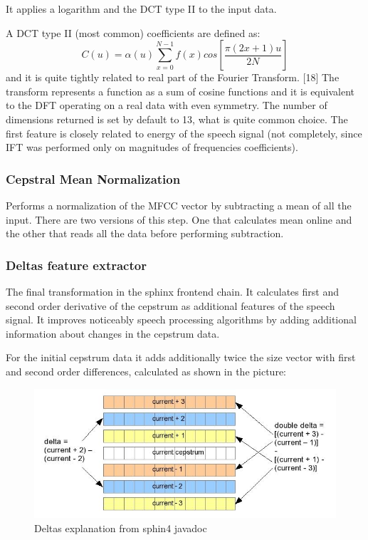 \documentclass[12pt,a4paper,english]{article}
\begin{document}
It applies a logarithm and the DCT type II to the input data.  \newline

A DCT type II (most common) coefficients are defined as: 
\begin{equation}
    C(u) = \alpha(u)\sum_{x=0}^{N-1} f(x)cos[\frac{\pi(2x+1)u}{2N}] 
\end{equation}
and it is quite tightly related to real part of the Fourier Transform. [18]
The transform represents a function as a sum of cosine functions and it is equivalent to the DFT operating on a real data with even symmetry. \newline
The number of dimensions returned is set by default to 13, what is quite common choice. The first feature is closely related
to energy of the speech signal (not completely, since IFT was performed only on magnitudes of frequencies coefficients).

\subsubsection{Cepstral Mean Normalization}

Performs a normalization of the MFCC vector by subtracting a mean of all the input. There are two versions
of this step. One that calculates mean online and the other that reads all the data before performing
subtraction.

\subsubsection{Deltas feature extractor}

The final transformation in the sphinx frontend chain. It calculates first and second order derivative of the
cepstrum as additional features of the speech signal. It improves noticeably speech processing algorithms
by adding additional information about changes in the cepstrum data. \newline

For the initial cepstrum data it adds additionally twice the size vector with first and second order
differences, calculated as shown in the picture:
\begin{figure}[hb]
    \centering
    \includegraphics[scale=0.6]{deltas_calc.jpg}
    \caption[]{Deltas explanation from sphin4 javadoc}
\end{figure}
\end{document}
